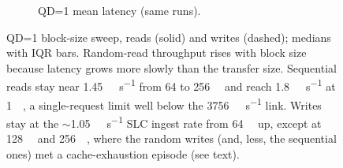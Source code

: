 \begin{figure}[!htbp]
{\begin{subfigure}[t]{0.49\linewidth}
      \caption{QD=1 mean latency (same runs).}
    \end{subfigure}%
  }
  \caption{QD=1 block-size sweep, reads (solid) and writes (dashed); medians with IQR bars. Random-read
  throughput rises with block size because latency grows more slowly than the transfer size. Sequential
  reads stay near \qty{1.45}{\gibi\byte\per\second} from 64 to \qty{256}{\kibi\byte} and reach
  \qty{1.8}{\gibi\byte\per\second} at \qty{1}{\mebi\byte}, a single-request limit well below the
  \qty{3756}{\mebi\byte\per\second} link. Writes stay at the
  \ensuremath{\sim}\qty{1.05}{\gibi\byte\per\second} SLC ingest rate from \qty{64}{\kibi\byte} up, except
  at \qty{128}{\kibi\byte} and \qty{256}{\kibi\byte}, where the random writes (and, less, the sequential
  ones) met a cache-exhaustion episode (see text).}\label{fig:block-size}
\end{figure}

